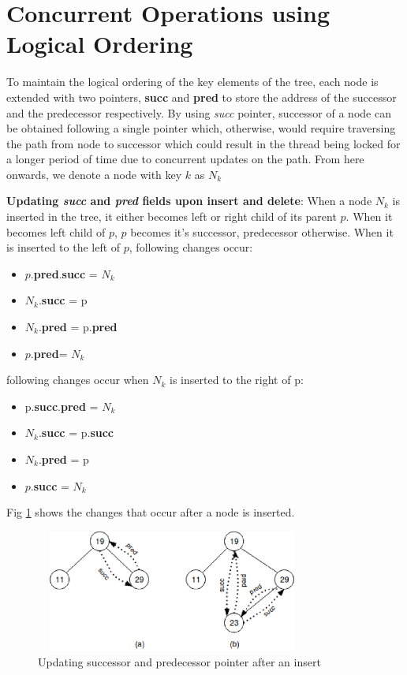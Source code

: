 \documentclass[MTech]{iitmdiss}
\begin{document}
\section{Concurrent Operations using Logical Ordering}
To maintain the logical ordering of the key elements of the tree, each node is extended with two pointers, \textbf{succ} and \textbf{pred} to store the address of the successor and the predecessor respectively. By using \textit{succ} pointer, successor of a node can be obtained following a single pointer which, otherwise, would require traversing the path from node to successor which could result in the thread being locked for a longer period of time due to concurrent updates on the path. From here onwards, we denote a node with key $k$ as $N_k$

\textbf{Updating \textit{succ} and \textit{pred} fields upon insert and delete}: When a node $N_k$ is inserted in the tree, it either becomes left or right child of its parent $p$. When it becomes left child of $p$, $p$ becomes it's successor, predecessor otherwise. When it is inserted to the left of $p$, following changes occur: 
\begin{itemize}
\item $p$.\textbf{pred}.\textbf{succ} = $N_k$
\item $N_k$.\textbf{succ} = p  
\item $N_k$.\textbf{pred} = p.\textbf{pred}
\item $p$.\textbf{pred}= $N_k$
\end{itemize}

following changes occur when $N_k$ is inserted to the right of p:
\begin{itemize}
\item p.\textbf{succ}.\textbf{pred} = $N_k$
\item $N_k$.\textbf{succ} = p.\textbf{succ}
\item $N_k$.\textbf{pred} = p
\item $p$.\textbf{succ} = $N_k$
\end{itemize}
 Fig \ref{fig:succ_pred_insert} shows the changes that occur after a node is inserted. 
\begin{figure}
\centering
\includegraphics[width=9cm, height= 4cm]{succ_pred_insert}
\caption{Updating successor and predecessor pointer after an insert}
\label{fig:succ_pred_insert}
\end{figure}
\end{document}
